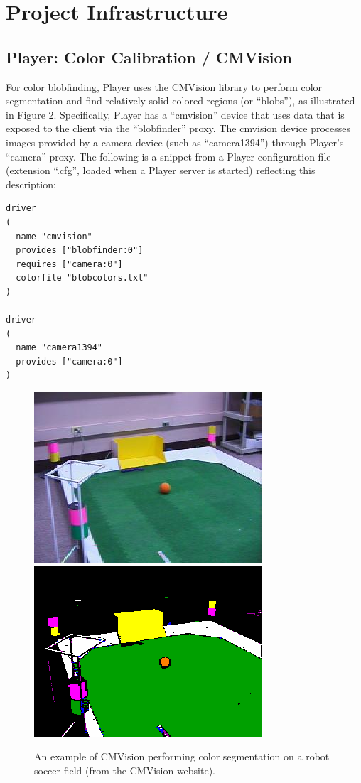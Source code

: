 \section{Project Infrastructure}

\subsection{Player: Color Calibration / CMVision}

For color blobfinding, Player uses the \href{http://www.cs.cmu.edu/~jbruce/cmvision/}{CMVision} library to perform color segmentation and 
find relatively solid colored regions (or ``blobs''), as illustrated in Figure 2.  Specifically, Player has a ``cmvision'' device that uses 
data that is exposed to the client via the ``blobfinder'' proxy.  The cmvision device processes images provided by a camera device (such as 
``camera1394'') through Player's ``camera'' proxy.  The following is a snippet from a Player configuration file (extension ``.cfg'', loaded 
when a Player server is started) reflecting this description:

\begin{verbatim}
driver
(
  name "cmvision"
  provides ["blobfinder:0"]
  requires ["camera:0"]
  colorfile "blobcolors.txt"
)

driver
(
  name "camera1394"
  provides ["camera:0"]
)
\end{verbatim}

\begin{figure}[!b]
\centering
\includegraphics[width=.49\textwidth]{figures/6_video.jpg}
\includegraphics[width=.49\textwidth]{figures/6_classified.png}
\caption{An example of CMVision performing color segmentation on a robot soccer field (from the CMVision website).}
\label{fig:CMVision}
\end{figure}


